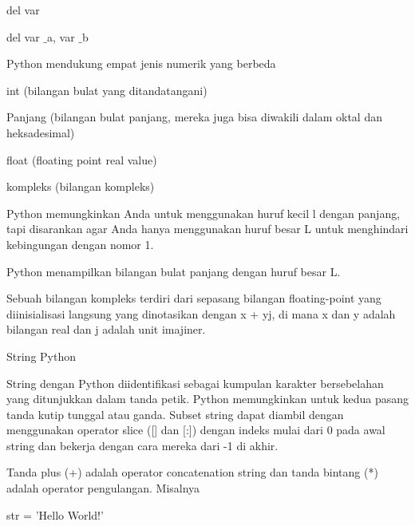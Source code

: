 del var \par
\noindent 
del var $  \_  $a, var $  \_  $b \par
\vspace{12pt}
\noindent 
Python mendukung empat jenis numerik yang berbeda  \par
\vspace{12pt}
\noindent 
int (bilangan bulat yang ditandatangani) \par
\vspace{12pt}
\noindent 
Panjang (bilangan bulat panjang, mereka juga bisa diwakili dalam oktal dan heksadesimal) \par
\vspace{12pt}
\noindent 
float (floating point real value) \par
\vspace{12pt}
\noindent 
kompleks (bilangan kompleks) \par
\vspace{12pt}
\noindent 
Python memungkinkan Anda untuk menggunakan huruf kecil l dengan panjang, tapi disarankan agar Anda hanya menggunakan huruf besar L untuk menghindari kebingungan dengan nomor 1.  \par
\noindent 
Python menampilkan bilangan bulat panjang dengan huruf besar L. \par
\vspace{12pt}
\noindent 
Sebuah bilangan kompleks terdiri dari sepasang bilangan floating-point yang diinisialisasi langsung yang dinotasikan dengan x + yj, di mana x dan y adalah bilangan real dan j adalah unit imajiner. \par
\vspace{12pt}
\noindent 
String Python \par
\vspace{12pt}
\noindent 
String dengan Python diidentifikasi sebagai kumpulan karakter bersebelahan yang ditunjukkan dalam tanda petik. $  $Python memungkinkan untuk kedua pasang tanda kutip tunggal atau ganda. $  $Subset string dapat diambil dengan menggunakan operator slice ([] dan [:]) dengan indeks mulai dari 0 pada awal string dan bekerja dengan cara mereka dari -1 di akhir. \par
\vspace{12pt}
\noindent 
Tanda plus (+) adalah operator concatenation string dan tanda bintang (*) adalah operator pengulangan. $  $Misalnya  \par
\vspace{12pt}
\vspace{12pt}
\noindent 
str = 'Hello World!' \par
